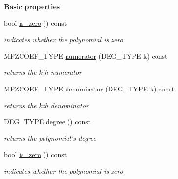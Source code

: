 \begin{Indent}\textbf{ Basic properties}\par
\begin{DoxyCompactItemize}
\item 
\mbox{\label{group__polygroup_a6959dd2fd63384953e774e63c1e2a344}} 
bool \hyperlink{group__polygroup_a6959dd2fd63384953e774e63c1e2a344}{is\+\_\+zero} () const
\begin{DoxyCompactList}\small\item\em indicates whether the polynomial is zero \end{DoxyCompactList}\item 
\mbox{\label{group__polygroup_a2301bb5e91284d51b7c7a49951f8c2d8}} 
M\+P\+Z\+C\+O\+E\+F\+\_\+\+T\+Y\+PE \hyperlink{group__polygroup_a2301bb5e91284d51b7c7a49951f8c2d8}{numerator} (D\+E\+G\+\_\+\+T\+Y\+PE k) const
\begin{DoxyCompactList}\small\item\em returns the $k$th numerator \end{DoxyCompactList}\item 
\mbox{\label{group__polygroup_ab44929e18d513793ff41b2061ea144ee}} 
M\+P\+Z\+C\+O\+E\+F\+\_\+\+T\+Y\+PE \hyperlink{group__polygroup_ab44929e18d513793ff41b2061ea144ee}{denominator} (D\+E\+G\+\_\+\+T\+Y\+PE k) const
\begin{DoxyCompactList}\small\item\em returns the $k$th denominator \end{DoxyCompactList}\item 
\mbox{\label{group__polygroup_a12c3fe334fa0eefdc2533bad00df262d}} 
D\+E\+G\+\_\+\+T\+Y\+PE \hyperlink{group__polygroup_a12c3fe334fa0eefdc2533bad00df262d}{degree} () const
\begin{DoxyCompactList}\small\item\em returns the polynomial's degree \end{DoxyCompactList}\item 
\mbox{\label{group__polygroup_a6959dd2fd63384953e774e63c1e2a344}} 
bool \hyperlink{group__polygroup_a6959dd2fd63384953e774e63c1e2a344}{is\+\_\+zero} () const
\begin{DoxyCompactList}\small\item\em indicates whether the polynomial is zero \end{DoxyCompactList}\item 

\end{DoxyCompactItemize}
\end{Indent}
